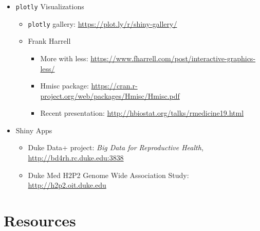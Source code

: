 \documentclass[10pt, letterpaper]{article}
\begin{document}
\begin{spacing}{1.0}
\begin{itemize}[noitemsep]
  \item \texttt{plotly} Visualizations
    \begin{itemize}
      \item \texttt{plotly} gallery:  \url{https://plot.ly/r/shiny-gallery/}
      \item Frank Harrell
        \begin{itemize}
          \item More with less:  \url{https://www.fharrell.com/post/interactive-graphics-less/}
          \item Hmisc package:  \url{https://cran.r-project.org/web/packages/Hmisc/Hmisc.pdf}
          \item Recent presentation:  \url{http://hbiostat.org/talks/rmedicine19.html}
        \end{itemize}
    \end{itemize}
  \item Shiny Apps
    \begin{itemize}[noitemsep]
      \item Duke Data+ project:  \textit{Big Data for Reproductive Health}, \url{http://bd4rh.rc.duke.edu:3838}
      \item Duke Med H2P2 Genome Wide Association Study:  \url{http://h2p2.oit.duke.edu}
    \end{itemize}
\end{itemize}



\section{Resources}\label{sec:resources}

\begin{itemize}


\end{itemize}
\end{spacing}
\end{document}
